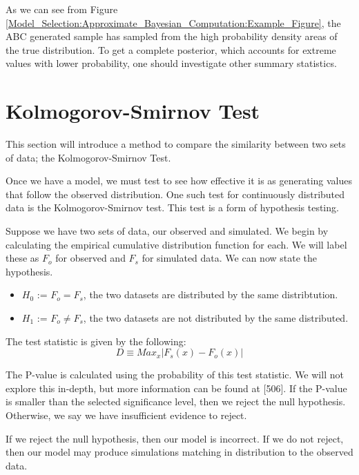 \begin{example}
    As we can see from Figure \ref{Model_Selection:Approximate_Bayesian_Computation:Example_Figure}, the ABC generated sample has sampled from the high probability density areas of the true distribution. To get a complete posterior, which accounts for extreme values with lower probability, one should investigate other summary statistics.
\end{example}




\section{Kolmogorov-Smirnov Test}
\label{Model_Selection:Kolmogorov_Smirnov_Test}

This section will introduce a method to compare the similarity between two sets of data; the Kolmogorov-Smirnov Test.

Once we have a model, we must test to see how effective it is as generating values that follow the observed distribution. One such test for continuously distributed data is the Kolmogorov-Smirnov test. This test is a form of hypothesis testing. 

Suppose we have two sets of data, our observed and simulated. We begin by calculating the empirical cumulative distribution function for each. We will label these as $F_o$ for observed and $F_s$ for simulated data. We can now state the hypothesis.

\begin{itemize}
    \item $H_0$ := $F_o = F_s$, the two datasets are distributed by the same distribtution.
    \item $H_1$ := $F_o \neq F_s$, the two datasets are not distributed by the same distributed. 
\end{itemize}

The test statistic is given by the following:
\begin{equation}
    D \equiv Max_x |F_s(x) - F_o(x)|
\end{equation}

The P-value is calculated using the probability of this test statistic. We will not explore this in-depth, but more information can be found at \cite{Ross2004}[506]. If the P-value is smaller than the selected significance level, then we reject the null hypothesis. Otherwise, we say we have insufficient evidence to reject. 

If we reject the null hypothesis, then our model is incorrect. If we do not reject, then our model may produce simulations matching in distribution to the observed data.
